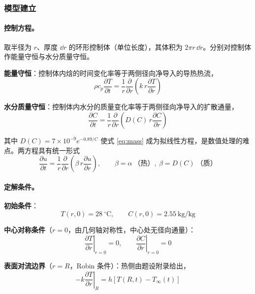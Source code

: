 \subsubsection{模型建立}
\paragraph{控制方程。} 取半径为 $r$、厚度 $\dd r$ 的环形控制体（单位长度），其体积为 $2\pi r\,\dd r$。分别对控制体作能量守恒与水分质量守恒。

\textbf{能量守恒}：控制体内焓的时间变化率等于两侧径向净导入的导热热流，
\begin{equation}
  \rho c_p\frac{\partial T}{\partial t}=\frac{1}{r}\frac{\partial}{\partial r}\!\left(k\,r\frac{\partial T}{\partial r}\right)
  \label{eq:heat}
\end{equation}

\textbf{水分质量守恒}：控制体内水分的质量变化率等于两侧径向净导入的扩散通量，
\begin{equation}
  \frac{\partial C}{\partial t}=\frac{1}{r}\frac{\partial}{\partial r}\!\left(D(C)\,r\frac{\partial C}{\partial r}\right)
  \label{eq:mass}
\end{equation}

其中 $D(C)=7\times10^{-9}e^{-0.89/C}$ 使式 \eqref{eq:mass} 成为拟线性方程，是数值处理的难点。两方程具有统一形式
\begin{equation}
  \frac{\partial u}{\partial t}=\frac{1}{r}\frac{\partial}{\partial r}\!\left(\beta\,r\frac{\partial u}{\partial r}\right),\qquad
  \beta=\alpha\ \text{（热）},\ \beta=D(C)\ \text{（质）}
  \label{eq:unified}
\end{equation}

\paragraph{定解条件。}
\textbf{初始条件}：
\begin{equation}
  T(r,0)=28\ ^\circ\mathrm{C},\qquad C(r,0)=2.55\ \mathrm{kg/kg}
  \label{eq:init}
\end{equation}

\textbf{中心对称条件}（$r=0$，由几何轴对称性，中心处无径向通量）：
\begin{equation}
  \left.\frac{\partial T}{\partial r}\right|_{r=0}=0,\qquad
  \left.\frac{\partial C}{\partial r}\right|_{r=0}=0
  \label{eq:center}
\end{equation}

\textbf{表面对流边界}（$r=R$，Robin 条件）：热侧由题设附录给出，
\begin{equation}
  -k\left.\frac{\partial T}{\partial r}\right|_{R}=h\left[T(R,t)-T_\infty(t)\right]
  \label{eq:robinT}
\end{equation}

